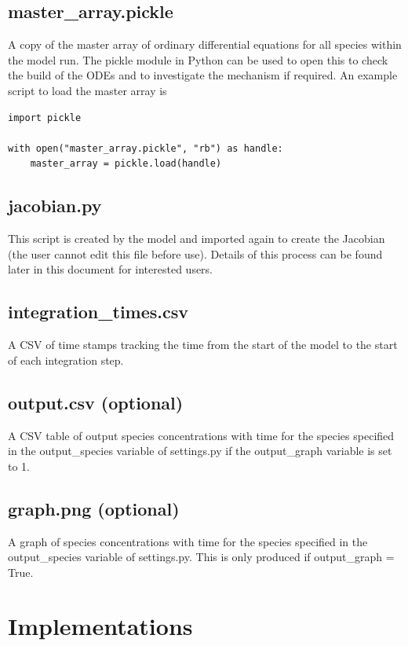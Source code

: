 \documentclass[a4paper]{refart}
\begin{document}
\subsection{master\_array.pickle}
A copy of the master array of ordinary differential equations for all species within the model run. The pickle module in Python can be used to open this to check the build of the ODEs and to investigate the mechanism if required. An example script to load the master array is
\begin{verbatim}
import pickle

with open("master_array.pickle", "rb") as handle:
    master_array = pickle.load(handle)
\end{verbatim}


\subsection{jacobian.py}
This script is created by the model and imported again to create the Jacobian (the user cannot edit this file before use). Details of this process can be found later in this document for interested users. 

\subsection{integration\_times.csv}
A CSV of time stamps tracking the time from the start of the model to the start of each integration step.

\subsection{output.csv (optional)}
A CSV table of output species concentrations with time for the species specified in the output\_species variable of settings.py if the output\_graph variable is set to 1.

\subsection{graph.png (optional)}
A graph of species concentrations with time for the species specified in the output\_species variable of settings.py. This is only produced if output\_graph = True.

\newpage
\section{Implementations}
\end{document}

